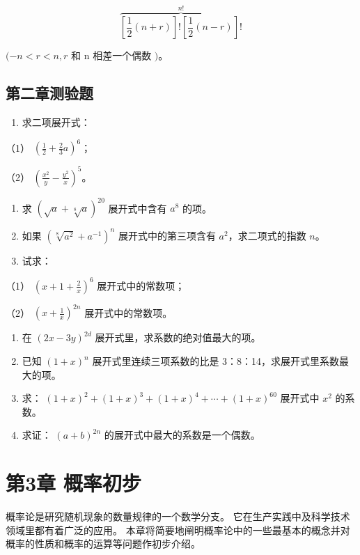 \[
\overbrace {\left[ \frac {1}{2} (n + r) \right] ! \left[ \frac {1}{2} (n - r) \right] !} ^ {n!}
\]

\((-n<r<n, r\) 和 n 相差一个偶数 \()\)。

\section{第二章测验题}

\begin{enumerate}
\item
  求二项展开式：
\end{enumerate}

（1） \(\left(\frac{1}{2} + \frac{2}{3} a\right)^6\)；

（2） \(\left(\frac{x^2}{y} - \frac{y^2}{x}\right)^5\)。

\begin{enumerate}[start=2]
\item
  求 \((\sqrt{a}+\sqrt[8]{a})^{20}\) 展开式中含有 \(a^{8}\) 的项。
\item
  如果 \((\sqrt[8]{a^2} + a^{-1})^n\) 展开式中的第三项含有
  \(a^2\)，求二项式的指数 \(n\)。
\item
  试求：
\end{enumerate}

（1） \(\left(x + 1 + \frac{2}{x}\right)^6\) 展开式中的常数项；

（2） \(\left(x + \frac{1}{x}\right)^{2n}\) 展开式中的常数项。

\begin{enumerate}[start=5]
\item
  在 \((2x - 3y)^{2d}\) 展开式里，求系数的绝对值最大的项。
\item
  已知 \((1 + x)^n\) 展开式里连续三项系数的比是
  3：8：14，求展开式里系数最大的项。
\item
  求： \((1+x)^{2}+(1+x)^{3}+(1+x)^{4}+\cdots+(1+x)^{60}\) 展开式中
  \(x^{2}\) 的系数。
\item
  求证： \((a+b)^{2n}\) 的展开式中最大的系数是一个偶数。
\end{enumerate}

\chapter{第3章 概率初步}

概率论是研究随机现象的数量规律的一个数学分支。
它在生产实践中及科学技术领域里都有着广泛的应用。
本章将简要地阐明概率论中的一些最基本的概念并对概率的性质和概率的运算等问题作初步介绍。

